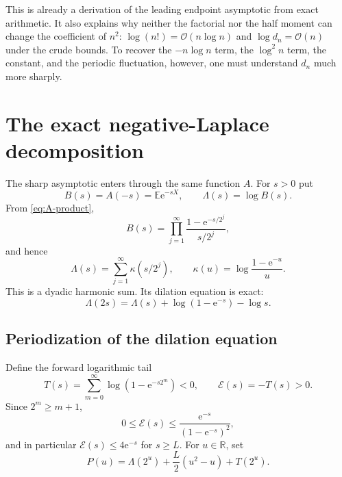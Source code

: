 \documentclass[11pt,oneside]{article}
\theoremstyle{definition}
\theoremstyle{remark}
\newcommand{\R}{\mathbb R}
\newcommand{\e}{\mathrm e}
\newcommand{\E}{\mathbb E}
\newcommand{\bigO}{\mathcal O}
\newcommand{\Lam}{\Lambda}
\begin{document}
This is already a derivation of the leading endpoint asymptotic from exact arithmetic.  It
also explains why neither the factorial nor the half moment can change the coefficient of
$n^2$: $\log(n!)=\bigO(n\log n)$ and $\log d_n=\bigO(n)$ under the crude bounds.  To recover
the $-n\log n$ term, the $\log^2n$ term, the constant, and the periodic fluctuation, however,
one must understand $d_n$ much more sharply.

\section{The exact negative-Laplace decomposition}
\label{sec:laplace-product}

The sharp asymptotic enters through the same function $A$.  For $s>0$ put
\begin{equation}
 B(s)=A(-s)=\E\e^{-sX},
 \qquad
 \Lam(s)=\log B(s).                                         \label{eq:B-Lambda}
\end{equation}
From \eqref{eq:A-product},
\begin{equation}
 B(s)=\prod_{j=1}^{\infty}
 \frac{1-\e^{-s/2^j}}{s/2^j},                               \label{eq:B-product}
\end{equation}
and hence
\begin{equation}
 \Lam(s)=\sum_{j=1}^{\infty}\kappa(s/2^j),
 \qquad
 \kappa(u)=\log\frac{1-\e^{-u}}u.                          \label{eq:Lambda-harmonic}
\end{equation}
This is a dyadic harmonic sum.  Its dilation equation is exact:
\begin{equation}
 \Lam(2s)=\Lam(s)+\log(1-\e^{-s})-\log s.                  \label{eq:Lambda-dilation}
\end{equation}

\subsection{Periodization of the dilation equation}

Define the forward logarithmic tail
\begin{equation}
 T(s)=\sum_{m=0}^{\infty}\log(1-\e^{-s2^m})<0,
 \qquad
 \mathcal E(s)=-T(s)>0.                                    \label{eq:tail}
\end{equation}
Since $2^m\ge m+1$,
\begin{equation}
 0\le\mathcal E(s)\le
 \frac{\e^{-s}}{(1-\e^{-s})^2},                            \label{eq:tail-bound-report}
\end{equation}
and in particular $\mathcal E(s)\le4\e^{-s}$ for $s\ge L$.
For $u\in\R$, set
\begin{equation}
 P(u)=\Lam(2^u)+\frac L2(u^2-u)+T(2^u).                    \label{eq:P-report}
\end{equation}
\end{document}
